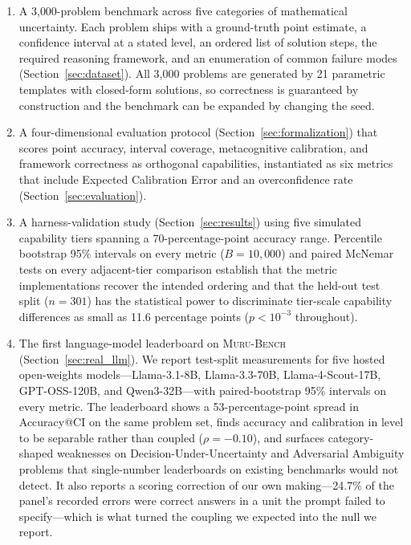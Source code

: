 \documentclass{article}
\newcommand{\muru}{\textsc{Muru-Bench}}
\begin{document}
\begin{enumerate}[leftmargin=*,itemsep=3pt]
    \item A 3{,}000-problem benchmark across five categories of mathematical uncertainty. Each problem ships with a ground-truth point estimate, a confidence interval at a stated level, an ordered list of solution steps, the required reasoning framework, and an enumeration of common failure modes (Section~\ref{sec:dataset}). All 3{,}000 problems are generated by 21 parametric templates with closed-form solutions, so correctness is guaranteed by construction and the benchmark can be expanded by changing the seed.
    \item A four-dimensional evaluation protocol (Section~\ref{sec:formalization}) that scores point accuracy, interval coverage, metacognitive calibration, and framework correctness as orthogonal capabilities, instantiated as six metrics that include Expected Calibration Error and an overconfidence rate (Section~\ref{sec:evaluation}).
    \item A harness-validation study (Section~\ref{sec:results}) using five simulated capability tiers spanning a 70-percentage-point accuracy range. Percentile bootstrap 95\% intervals on every metric ($B = 10{,}000$) and paired McNemar tests on every adjacent-tier comparison establish that the metric implementations recover the intended ordering and that the held-out test split ($n = 301$) has the statistical power to discriminate tier-scale capability differences as small as 11.6 percentage points ($p < 10^{-3}$ throughout).
    \item The first language-model leaderboard on \muru{} (Section~\ref{sec:real_llm}). We report test-split measurements for five hosted open-weights models---Llama-3.1-8B, Llama-3.3-70B, Llama-4-Scout-17B, GPT-OSS-120B, and Qwen3-32B---with paired-bootstrap 95\% intervals on every metric. The leaderboard shows a 53-percentage-point spread in Accuracy@CI on the same problem set, finds accuracy and calibration in level to be separable rather than coupled ($\rho = -0.10$), and surfaces category-shaped weaknesses on Decision-Under-Uncertainty and Adversarial Ambiguity problems that single-number leaderboards on existing benchmarks would not detect. It also reports a scoring correction of our own making---24.7\% of the panel's recorded errors were correct answers in a unit the prompt failed to specify---which is what turned the coupling we expected into the null we report.
\end{enumerate}
\end{document}
